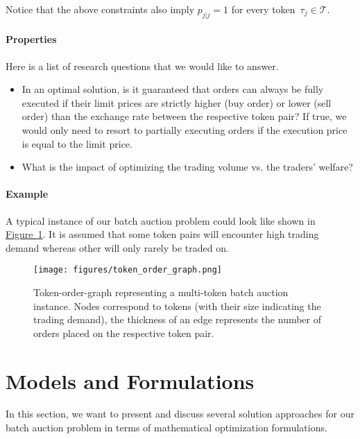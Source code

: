 \documentclass[11pt,parskip=full]{scrartcl}%
\newcommand*{\tokens}{\mathcal{T}}          %
\newcommand*{\figref}[1]{\hyperref[{#1}]{Figure~\ref*{#1}}}
\begin{document}
Notice that the above constraints also imply $ p_{j|j} = 1 $ for every
token~$ \tau_j \in \tokens $.

\paragraph{Properties}

Here is a list of research questions that we would like to answer.

\begin{itemize}
  \item In an optimal solution, is it guaranteed that orders can always be fully executed if their
  limit prices are strictly higher (buy order) or lower (sell order) than the exchange rate between
  the respective token pair?
  If true, we would only need to resort to partially executing orders if the execution price is
  equal to the limit price.
  \item What is the impact of optimizing the trading volume vs. the traders' welfare?
\end{itemize}


\paragraph{Example}

A typical instance of our batch auction problem could look like shown in 
\figref{fig:order-token-graph}.
It is assumed that some token pairs will encounter high trading demand whereas other will only
rarely be traded on.

\begin{figure}[t]
  \centering
  \texttt{[image: figures/token\_order\_graph.png]}
  \caption{Token-order-graph representing a multi-token batch auction instance. Nodes correspond
  to tokens (with their size indicating the trading demand), the thickness of an edge represents 
  the number of orders placed on the respective token pair.}
  \label{fig:order-token-graph}
\end{figure}


\clearpage
\section{Models and Formulations}
\label{sec:models}

In this section, we want to present and discuss several solution approaches for our batch auction
problem in terms of mathematical optimization formulations.
\end{document}
